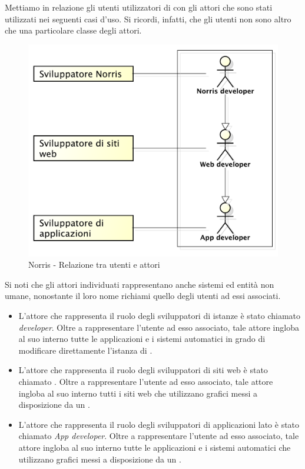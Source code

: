	Mettiamo in relazione gli utenti utilizzatori di  con gli attori che sono stati utilizzati nei seguenti casi d'uso. Si ricordi, infatti, che gli utenti non sono altro che una particolare classe degli attori.
	\begin{figure}[H]
		\centering
		\includegraphics[scale=0.4]{Pics/UtentiAttoriNorris}
		\caption{Norris - Relazione tra utenti e attori}
	\end{figure}
	Si noti che gli attori individuati rappresentano anche sistemi ed entità non umane, nonostante il loro nome richiami quello degli utenti ad essi associati.
	\begin{itemize}
		\item L'attore che rappresenta il ruolo degli sviluppatori di istanze  è stato chiamato \emph{ developer}. Oltre a rappresentare l'utente ad esso associato, tale attore ingloba al suo interno tutte le applicazioni e i sistemi automatici in grado di modificare direttamente l'istanza di .
		\item L'attore che rappresenta il ruolo degli sviluppatori di siti web è stato chiamato \emph{}. Oltre a rappresentare l'utente ad esso associato, tale attore ingloba al suo interno tutti i siti web che utilizzano grafici messi a disposizione da un  .
		\item L'attore che rappresenta il ruolo degli sviluppatori di applicazioni lato  è stato chiamato \emph{App developer}. Oltre a rappresentare l'utente ad esso associato, tale attore ingloba al suo interno tutte le applicazioni e i sistemi automatici che utilizzano grafici messi a disposizione da un  .
	\end{itemize}
	

